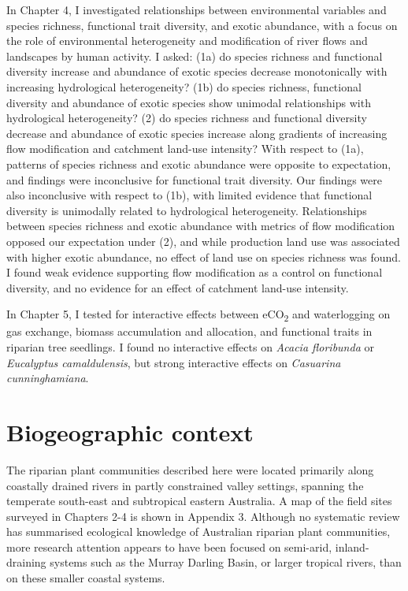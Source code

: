 \documentclass[openright,12pt,a4paper]{memoir}
\begin{document}
In Chapter 4, I investigated relationships between environmental variables and species richness, functional trait diversity, and exotic abundance, with a focus on the role of environmental heterogeneity and modification of river flows and landscapes by human activity. I asked: (1a) do species richness and functional diversity increase and abundance of exotic species decrease monotonically with increasing hydrological heterogeneity? (1b) do species richness, functional diversity and abundance of exotic species show unimodal relationships with hydrological heterogeneity? (2) do species richness and functional diversity decrease and abundance of exotic species increase along gradients of increasing flow modification and catchment land-use intensity? With respect to (1a), patterns of species richness and exotic abundance were opposite to expectation, and findings were inconclusive for functional trait diversity. Our findings were also inconclusive with respect to (1b), with limited evidence that functional diversity is unimodally related to hydrological heterogeneity. Relationships between species richness and exotic abundance with metrics of flow modification opposed our expectation under (2), and while production land use was associated with higher exotic abundance, no effect of land use on species richness was found. I found weak evidence supporting flow modification as a control on functional diversity, and no evidence for an effect of catchment land-use intensity.

In Chapter 5, I tested for interactive effects between eCO\textsubscript{2} and waterlogging on gas exchange, biomass accumulation and allocation, and functional traits in riparian tree seedlings. I found no interactive effects on \textit{Acacia floribunda} or \textit{Eucalyptus camaldulensis}, but strong interactive effects on \textit{Casuarina cunninghamiana}.

\section{Biogeographic context}
The riparian plant communities described here were located primarily along coastally drained rivers in partly constrained valley settings, spanning the temperate south-east and subtropical eastern Australia. A map of the field sites surveyed in Chapters 2-4 is shown in Appendix 3. Although no systematic review has summarised ecological knowledge of Australian riparian plant communities, more research attention appears to have been focused on semi-arid, inland-draining systems such as the Murray Darling Basin, or larger tropical rivers, than on these smaller coastal systems.
\end{document}
